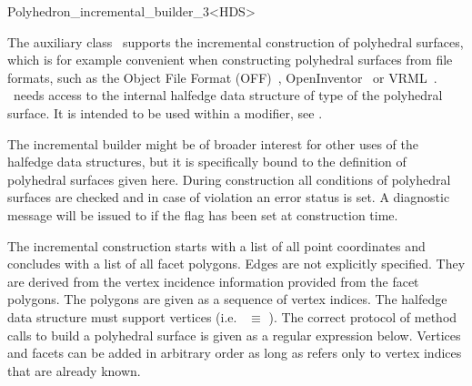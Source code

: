 
\ccRefPageBegin



\begin{ccRefClass}{Polyhedron_incremental_builder_3<HDS>}
\label{pagePolyIncrBuilder}

\ccDefinition
{}
  
The auxiliary class \ccClassTemplateName\ supports the incremental
construction of polyhedral surfaces, which is for example convenient
when constructing polyhedral surfaces from file formats, such as the
Object File Format (OFF)~\cite{p-gmgv15-94},
OpenInventor~\cite{w-impoo-94} or VRML~\cite{bpp-vrml-95,vrmls-96}.
\ccClassTemplateName\ needs access to the internal halfedge data
structure of type  of the polyhedral surface. It is intended
to be used within a modifier, see .

The incremental builder might be of broader interest for other uses of
the halfedge data structures, but it is specifically bound to the
definition of polyhedral surfaces given here. During construction all
conditions of polyhedral surfaces are checked and in case of violation
an error status is set. A diagnostic message will be issued to
 if the  flag has been set at construction
time.

The incremental construction starts with a list of all point
coordinates and concludes with a list of all facet polygons. Edges are
not explicitly specified. They are derived from the vertex incidence
information provided from the facet polygons. The polygons are given as a
sequence of vertex indices.  The halfedge data structure  must
support vertices (i.e.~ $\equiv$
). The correct protocol of method calls to build a
polyhedral surface is given as a regular expression below. Vertices and
facets can be added in arbitrary order as long as
 refers only to vertex indices that are
already known.


\end{ccRefClass}
